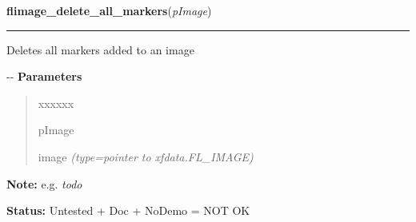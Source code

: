     \label{xformslib:flflimage:flimage_delete_all_markers}

    \vspace{0.5ex}

\hspace{.8\funcindent}\begin{boxedminipage}{\funcwidth}

    \raggedright \textbf{flimage\_delete\_all\_markers}(\textit{pImage})

    \vspace{-1.5ex}

    \rule{\textwidth}{0.5\fboxrule}
\setlength{\parskip}{2ex}

Deletes all markers added to an image

-{}-
\setlength{\parskip}{1ex}
      \textbf{Parameters}
      \vspace{-1ex}

      \begin{quote}
        \begin{Ventry}{xxxxxx}

          \item[pImage]


image
            {\it (type=pointer to xfdata.FL\_IMAGE)}

        \end{Ventry}

      \end{quote}

\textbf{Note:} 
e.g. \emph{todo}


\textbf{Status:} 
Untested + Doc + NoDemo = NOT OK


    \end{boxedminipage}

    \label{xformslib:flflimage:flimage_render_annotation}

    \vspace{0.5ex}

